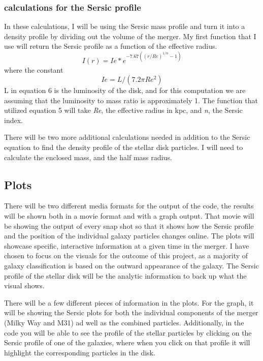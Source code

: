 \documentclass{aastex63}
\begin{document}
\subsubsection{calculations for the Sersic profile}
In these calculations, I will be using the Sersic mass profile and turn it into a density profile by dividing out the volume of the merger. My first function that I use will return the Sersic profile as a function of the effective radius.
\begin{equation}
    I(r) = Ie*e^{-7.67((r/Re)^{1/n}-1)}
\end{equation}
where the constant
\begin{equation}
    Ie = L/(7.2\pi Re^2)
\end{equation}
L in equation 6 is the luminosity of the disk, and for this computation we are assuming that the luminosity to mass ratio is approximately 1. The function that utilized equation 5 will take \textit{Re}, the effective radius in kpc, and \textit{n}, the Sersic index. 

\medskip

There will be two more additional calculations needed in addition to the Sersic equation to find the density profile of the stellar disk particles. I will need to calculate the enclosed mass, and the half mass radius. 


\subsection{Plots}

There will be two different media formats for the output of the code, the results will be shown both in a movie format and with a graph output. That movie will be showing the output of every snap shot so that it shows how the Sersic profile and the position of the individual galaxy particles changes online. The plots will showcase specific, interactive information at a given time in the merger. I have chosen to focus on the visuals for the outcome of this project, as a majority of galaxy classification is based on the outward appearance of the galaxy. The Sersic profile of the stellar disk will be the analytic information to back up what the visual shows. 

\medskip

There will be a few different pieces of information in the plots. For the graph, it will be showing the Sersic plots for both the individual components of the merger (Milky Way and M31) ad well as the combined particles. Additionally, in the code you will be able to see the profile of the stellar particles by clicking on the Sersic profile of one of the galaxies, where when you click on that profile it will highlight the corresponding particles in the disk.
\end{document}
